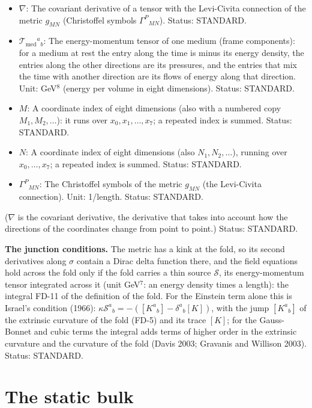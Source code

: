 \documentclass[
  10pt,
]{article}
\providecommand{\tightlist}{%
  \setlength{\itemsep}{0pt}\setlength{\parskip}{0pt}}
\begin{document}
\begin{itemize}
\tightlist
\item
  \(\nabla\): The covariant derivative of a tensor with the Levi-Civita
  connection of the metric \(g_{MN}\) (Christoffel symbols
  \(\Gamma^P{}_{MN}\)). Status: STANDARD.
\item
  \(\mathcal{T}_{\mathrm{med}}{}^a{}_b\): The energy-momentum tensor of
  one medium (frame components): for a medium at rest the entry along
  the time is minus its energy density, the entries along the other
  directions are its pressures, and the entries that mix the time with
  another direction are its flows of energy along that direction. Unit:
  GeV\(^8\) (energy per volume in eight dimensions). Status: STANDARD.
\item
  \(M\): A coordinate index of eight dimensions (also with a numbered
  copy \(M_1, M_2, \dots\)): it runs over \(x_0, x_1, \dots, x_7\); a
  repeated index is summed. Status: STANDARD.
\item
  \(N\): A coordinate index of eight dimensions (also
  \(N_1, N_2, \dots\)), running over \(x_0, \dots, x_7\); a repeated
  index is summed. Status: STANDARD.
\item
  \(\Gamma^P{}_{MN}\): The Christoffel symbols of the metric \(g_{MN}\)
  (the Levi-Civita connection). Unit: 1/length. Status: STANDARD.
\end{itemize}

(\(\nabla\) is the covariant derivative, the derivative that takes into
account how the directions of the coordinates change from point to
point.) Status: STANDARD.

\textbf{The junction conditions.} The metric has a kink at the fold, so
its second derivatives along \(\sigma\) contain a Dirac delta function
there, and the field equations hold across the fold only if the fold
carries a thin source \(\mathcal{S}\), its energy-momentum tensor
integrated across it (unit GeV\(^7\): an energy density times a length):
the integral FD-11 of the definition of the fold. For the Einstein term
alone this is Israel's condition (1966):
\(\kappa\mathcal{S}^a{}_b = -([K^a{}_b] - \delta^a{}_b[K])\), with the
jump \([K^a{}_b]\) of the extrinsic curvature of the fold (FD-5) and its
trace \([K]\); for the Gauss-Bonnet and cubic terms the integral adds
terms of higher order in the extrinsic curvature and the curvature of
the fold (Davis 2003; Gravanis and Willison 2003). Status: STANDARD.

\hypertarget{the-static-bulk}{%
\section{The static bulk}\label{the-static-bulk}}
\end{document}
